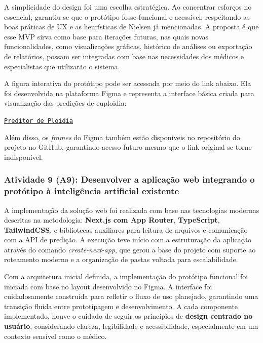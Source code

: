 A simplicidade do design foi uma escolha estratégica. Ao concentrar esforços no essencial, garantiu-se que o protótipo fosse funcional e acessível, respeitando as boas práticas de UX e as heurísticas de Nielsen já mencionadas. A proposta é que esse MVP sirva como base para iterações futuras, nas quais novas funcionalidades, como visualizações gráficas, histórico de análises ou exportação de relatórios, possam ser integradas com base nas necessidades dos médicos e especialistas que utilizarão o sistema.

A figura interativa do protótipo pode ser acessada por meio do link abaixo. Ela foi desenvolvida na plataforma Figma e representa a interface básica criada para visualização das predições de euploidia:

\begin{center}
    \href{https://www.figma.com/design/0AstYynXwZO9zVudP1NimJ/Predi%C3%A7%C3%A3o-de-Ploidia?node-id=1-2&t=GcDVvNcPFkmVPj8F-1}{\texttt{Preditor de Ploidia}}
\end{center}

Além disso, os \textit{frames} do Figma também estão disponíveis no repositório do projeto no GitHub, garantindo acesso futuro mesmo que o link original se torne indisponível.


\subsubsection{Atividade 9 (A9):  Desenvolver a aplicação web integrando o protótipo à inteligência artificial existente}
A implementação da solução web foi realizada com base nas tecnologias modernas descritas na metodologia: \textbf{Next.js com App Router}, \textbf{TypeScript}, \textbf{TailwindCSS}, e bibliotecas auxiliares para leitura de arquivos e comunicação com a API de predição. A execução teve início com a estruturação da aplicação através do comando \textit{create-next-app}, que gerou a base do projeto com suporte ao roteamento moderno e a organização de pastas voltada para escalabilidade.

Com a arquitetura inicial definida, a implementação do protótipo funcional foi iniciada com base no layout desenvolvido no Figma. A interface foi cuidadosamente construída para refletir o fluxo de uso planejado, garantindo uma transição fluida entre prototipagem e desenvolvimento. A cada componente implementado, houve o cuidado de seguir os princípios de \textbf{design centrado no usuário}, considerando clareza, legibilidade e acessibilidade, especialmente em um contexto sensível como o médico.


